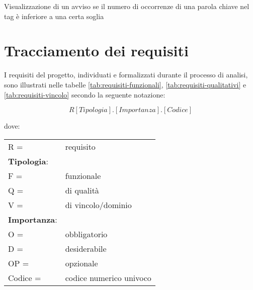 \begin{usecase}{12}{Visualizzazione di un avviso se il numero di occorrenze di una parola chiave nel tag è inferiore a una certa soglia}\label{UC12}
\end{usecase}

\newpage

\section{Tracciamento dei requisiti}
\par I requisiti del progetto, individuati e formalizzati durante il processo di analisi, sono illustrati nelle tabelle \ref{tab:requisiti-funzionali}, \ref{tab:requisiti-qualitativi} e \ref{tab:requisiti-vincolo} secondo la seguente notazione:
\par \textbf{\[R[Tipologia].[Importanza].[Codice]\]} 
\par dove:
\par\vspace{20pt}
\begin{tabular}{@{}ll@{}}
    R = & requisito \\
    \textbf{Tipologia}: & \\
    \quad F = & funzionale \\
    \quad Q = & di qualità \\
    \quad V = & di vincolo/dominio \\
    \textbf{Importanza}: & \\
    \quad O = & obbligatorio \\
    \quad D = & desiderabile \\  
    \quad OP = & opzionale \\
    Codice = & codice numerico univoco \\
\end{tabular}
    
\newpage

